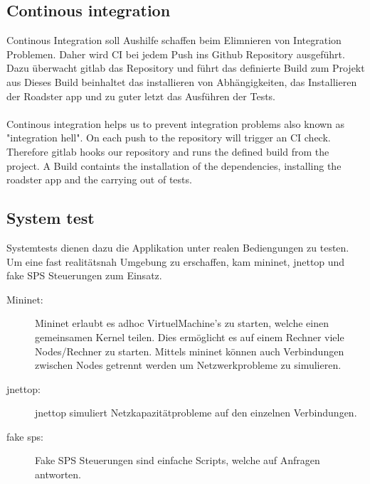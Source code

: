 \subsection{Continous integration}
Continous Integration soll Aushilfe schaffen beim Elimnieren von Integration Problemen. 
Daher wird CI bei jedem Push ins Github Repository ausgeführt. Dazu überwacht gitlab 
das Repository und führt das definierte Build zum Projekt aus
Dieses Build beinhaltet das installieren von Abhängigkeiten, das Installieren der Roadster app und
zu guter letzt das Ausführen der Tests.\\
\\
Continous integration helps us to prevent integration problems also known as "integration hell". On
each push to the repository will trigger an CI check. Therefore gitlab hooks our repository and 
runs the defined build from the project. A Build containts the installation of the dependencies, 
installing the roadster app and the carrying out of tests.

\subsection{System test}
Systemtests dienen dazu die Applikation unter realen Bediengungen zu testen. Um eine fast realitätsnah
Umgebung zu erschaffen, kam mininet, jnettop und fake SPS Steuerungen zum Einsatz.
\begin{description}
	\item [Mininet:]
		Mininet erlaubt es adhoc VirtuelMachine's zu starten, 
		welche einen gemeinsamen Kernel teilen.
		Dies ermöglicht es auf einem Rechner viele Nodes/Rechner zu starten. 
		Mittels mininet können auch Verbindungen zwischen Nodes getrennt werden
		um Netzwerkprobleme zu simulieren. 
	\item [jnettop:]
		jnettop simuliert Netzkapazitätprobleme auf den einzelnen Verbindungen.
	\item [fake sps:]
		Fake SPS Steuerungen sind einfache Scripts, welche auf Anfragen antworten.
\end{description}

